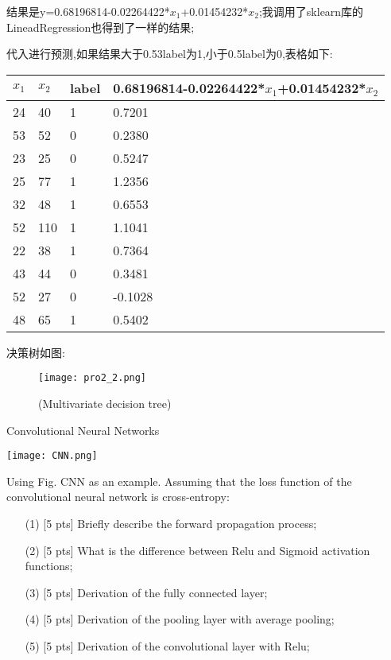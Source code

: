 \documentclass[11pt, a4paper, UTF8]{ctexart}
\begin{document}
\begin{solution}
\begin{enumerate}
结果是y=0.68196814-0.02264422*$x_1$+0.01454232*$x_2$;我调用了sklearn库的LineadRegression也得到了一样的结果;

代入进行预测,如果结果大于0.53label为1,小于0.5label为0,表格如下:

\begin{tabular}{|l|l|l|l|} %
	\hline 
	$x_1$&$x_2$&label&0.68196814-0.02264422*$x_1$+0.01454232*$x_2$\\
	\hline  
	24&40&1&0.7201\\\hline 
	53&52&0&0.2380\\\hline 
	23&25&0&0.5247\\\hline 
	25&77&1&1.2356\\\hline 
	32&48&1&0.6553\\\hline 
	52&110&1&1.1041\\\hline 
	22&38&1&0.7364\\\hline 
	43&44&0&0.3481\\\hline 
	52&27&0&-0.1028\\\hline 
	48&65&1&0.5402\\
	\hline 
\end{tabular}

决策树如图:

	 \begin{figure}[htbp] 
	\centering
	\texttt{[image: pro2\_2.png]}
	\caption{(Multivariate decision tree)}
\end{figure} 

\end{enumerate}

\end{solution}
\newpage
\begin{problem}[ML problem 3]
	[25pts] Convolutional Neural Networks


	\texttt{[image: CNN.png]}

	Using Fig. CNN as an example. Assuming that the loss function of the convolutional neural network is cross-entropy:
	
    \begin{enumerate}
	\item [(1)] [5 pts] Briefly describe the forward propagation process;
	\item [(2)] [5 pts] What is the difference between Relu and Sigmoid activation functions;
	\item [(3)] [5 pts] Derivation of the fully connected layer;
	\item [(4)] [5 pts] Derivation of the pooling layer with average pooling;
	\item [(5)] [5 pts] Derivation of the convolutional layer with Relu;
\end{enumerate}

	
\end{problem}
\end{document}
